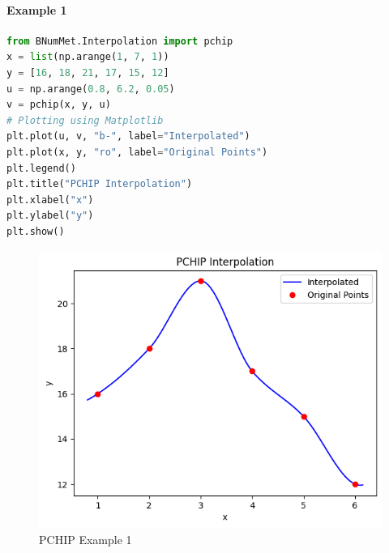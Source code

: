 \paragraph{Example 1}{
\begin{lstlisting}[language=Python]
from BNumMet.Interpolation import pchip
x = list(np.arange(1, 7, 1))
y = [16, 18, 21, 17, 15, 12]
u = np.arange(0.8, 6.2, 0.05)
v = pchip(x, y, u)
# Plotting using Matplotlib
plt.plot(u, v, "b-", label="Interpolated")
plt.plot(x, y, "ro", label="Original Points")
plt.legend()
plt.title("PCHIP Interpolation")
plt.xlabel("x")
plt.ylabel("y")
plt.show()
\end{lstlisting}

\begin{figure}[H]
    \centering
    \includegraphics{Include/Images/Thesis/Documentation/Interpolation/PCHIP Example 1.png}
    \caption{PCHIP Example 1}
    \label{fig:PCHIP Example 1}
\end{figure}
}